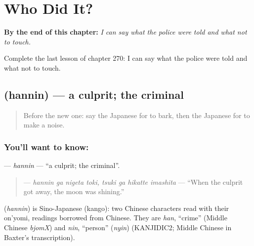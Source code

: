 
\chapter{Who Did It?}
\label{ch:ja-who-did-it}

\begin{chapteropening}
\textbf{By the end of this chapter:} \emph{I can say what the police were told and what not to touch.}

Complete the last lesson of chapter 270: I can say what the police were told and what not to touch.
\end{chapteropening}

\section[\texorpdfstring{\ja{はんにん} (hannin)}{はんにん (hannin)}]{ (hannin) — a culprit; the criminal}

\label{lesson:JA-C270-hannin}



\begin{quote}
Before the new one: say the Japanese for to bark, then the Japanese for to make a noise.
\end{quote}

\subsection*{You'll want to know: }
\textbf{} — \emph{hannin} — \textquotedblleft{}a culprit; the criminal\textquotedblright{}.

\begin{quote}
\textbf{   } — \emph{hannin ga nigeta toki, tsuki ga hikatte imashita} — \textquotedblleft{}When the culprit got away, the moon was shining.\textquotedblright{}
\end{quote}

\begin{cousinweb}
\textbf{} (\emph{hannin}) is Sino-Japanese (kango): two Chinese characters read with their on'yomi, readings borrowed from Chinese. They are \emph{han}, \textquotedblleft{}crime\textquotedblright{} (Middle Chinese \emph{bjomX}) and \emph{nin}, \textquotedblleft{}person\textquotedblright{} (\emph{nyin}) (KANJIDIC2; Middle Chinese in Baxter's transcription).
\end{cousinweb}

